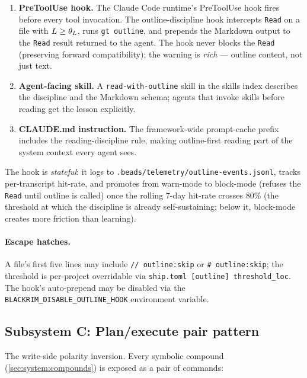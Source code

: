 \begin{enumerate}[leftmargin=*]
  \item \textbf{PreToolUse hook.} The Claude Code runtime's
        PreToolUse hook \cite{anthropic2024claudecode} fires before
        every tool invocation. The outline-discipline hook
        intercepts \texttt{Read} on a file with $L \geq
        \theta_{L}$, runs \texttt{gt outline}, and prepends the
        Markdown output to the \texttt{Read} result returned to the
        agent. The hook never blocks the \texttt{Read} (preserving
        forward compatibility); the warning is \emph{rich} ---
        outline content, not just text.
  \item \textbf{Agent-facing skill.} A \texttt{read-with-outline}
        skill in the skills index describes the discipline and the
        Markdown schema; agents that invoke skills before reading
        get the lesson explicitly.
  \item \textbf{CLAUDE.md instruction.} The framework-wide
        prompt-cache prefix includes the reading-discipline rule,
        making outline-first reading part of the system context
        every agent sees.
\end{enumerate}

The hook is \emph{stateful}: it logs to
\texttt{.beads/telemetry/outline-events.jsonl}, tracks per-transcript
hit-rate, and promotes from warn-mode to block-mode (refuses the
\texttt{Read} until outline is called) once the rolling 7-day
hit-rate crosses 80\% (the threshold at which the discipline is
already self-sustaining; below it, block-mode creates more friction
than learning).

\paragraph{Escape hatches.} A file's first five lines may include
\texttt{// outline:skip} or \texttt{\# outline:skip}; the threshold
is per-project overridable via \texttt{ship.toml [outline]
threshold\_loc}. The hook's auto-prepend may be disabled via the
\texttt{BLACKRIM\_DISABLE\_OUTLINE\_HOOK} environment variable.

\subsection{Subsystem C: Plan/execute pair pattern}
\label{sec:system:planexecute}

The write-side polarity inversion. Every symbolic compound
(\cref{sec:system:compounds}) is exposed as a pair of commands:

